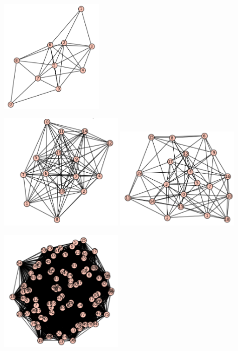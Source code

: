 \documentclass[10pt, a4paper]{article}
\begin{document}
\begin{center}
\includegraphics[width=5cm]{graf_10_0}
\end{center}

\begin{center}
\includegraphics[width=6cm]{graf_15_2}
\includegraphics[width=6cm]{graf_20_2}
\end{center}


\begin{center}
\includegraphics[width=6cm]{graf_100_2}
\end{center}
\end{document}
